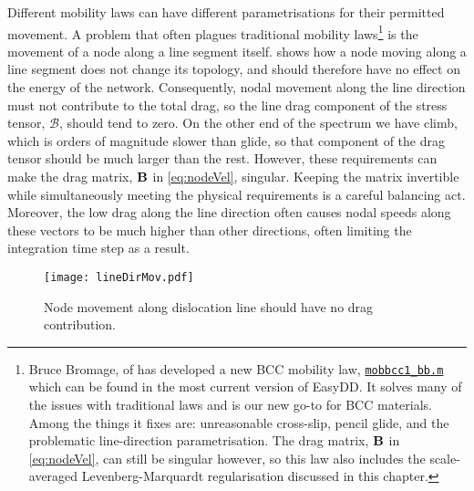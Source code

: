 Different mobility laws can have different parametrisations for their permitted movement. A problem that often plagues traditional mobility laws\footnote{Bruce Bromage, of \cite{bromage2018calculating} has developed a new BCC mobility law, \href{https://github.com/TarletonGroup/EasyDD/blob/master/src/mobbcc_bb1b.m}{\texttt{mobbcc1\_bb.m}} which can be found in the most current version of EasyDD. It solves many of the issues with traditional laws and is our new go-to for BCC materials. Among the things it fixes are: unreasonable cross-slip, pencil glide, and the problematic line-direction parametrisation. The drag matrix, $\mathbf{B}$ in \cref{eq:nodeVel}, can still be singular however, so this law also includes the scale-averaged Levenberg-Marquardt regularisation discussed in this chapter.} is the movement of a node along a line segment itself.  shows how a node moving along a line segment does not change its topology, and should therefore have no effect on the energy of the network. Consequently, nodal movement along the line direction must not contribute to the total drag, so the line drag component of the stress tensor, $\mathcal{B}$, should tend to zero. On the other end of the spectrum we have climb, which is orders of magnitude slower than glide, so that component of the drag tensor should be much larger than the rest. However, these requirements can make the drag matrix, $\mathbf{B}$ in \cref{eq:nodeVel}, singular. Keeping the matrix invertible while simultaneously meeting the physical requirements is a careful balancing act. Moreover, the low drag along the line direction often causes nodal speeds along these vectors to be much higher than other directions, often limiting the integration time step as a result.
\begin{figure}
    \centering
    \texttt{[image: lineDirMov.pdf]}
    \caption{Node movement along dislocation line should have no drag contribution.}
    \label{f:lineMovement}
\end{figure}

